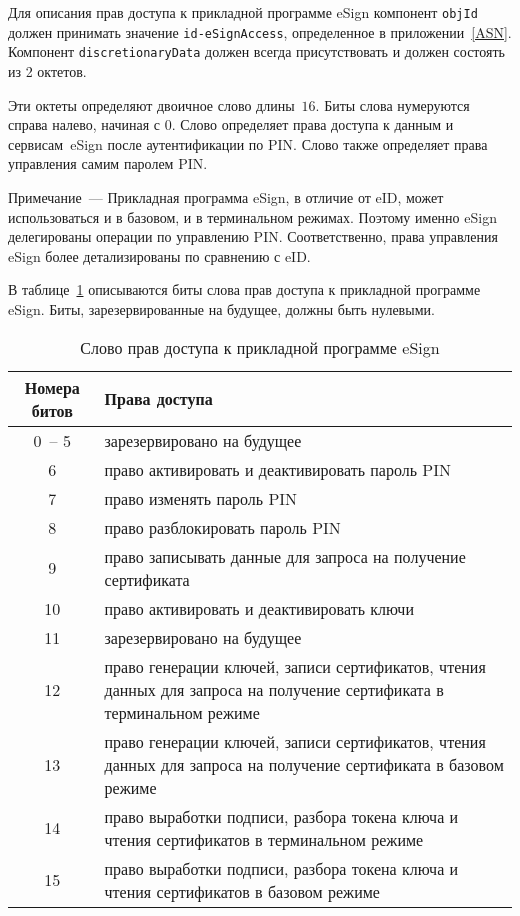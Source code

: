 Для описания прав доступа к прикладной программе eSign компонент \verb|objId| 
должен принимать значение \verb|id-eSignAccess|, определенное в 
приложении~\ref{ASN}. Компонент \verb|discretionaryData| должен всегда 
присутствовать и должен состоять из 2 октетов.


Эти октеты определяют двоичное слово длины~$16$. 
Биты слова нумеруются справа налево, начиная с 0. 
Слово определяет права доступа к данным и сервисам~eSign
после аутентификации по PIN. Слово также определяет права управления самим 
паролем PIN. 

\begin{note}
Примечание~--- 
Прикладная программа eSign, в отличие от eID, может использоваться и в базовом, 
и в терминальном режимах. Поэтому именно eSign делегированы операции по 
управлению PIN. Соответственно, права управления eSign более детализированы по 
сравнению с eID.
\end{note}

В таблице~\ref{Table.DATA.SMTAccess} описываются биты слова прав доступа
к прикладной программе eSign. Биты, зарезервированные на будущее, 
должны быть нулевыми.

\begin{table}[h!]
\caption{Слово прав доступа к прикладной программе eSign}
\label{Table.DATA.SMTAccess}
\begin{tabular}{|c|p{13.5cm}|}
\hline
Номера битов & Права доступа\\
\hline
\hline
0~-- 5 &  
зарезервировано на будущее\\ 
%
\hline 
6 &
право активировать и деактивировать пароль PIN\\ 
%
\hline 
7 &
право изменять пароль PIN\\ 
%
\hline 
8 &
право разблокировать пароль PIN\\ 
%
\hline 
9 &
право записывать данные для запроса на получение сертификата\\ 
%
\hline 
10 &
право активировать и деактивировать ключи\\ 
%
\hline 
11 &
зарезервировано на будущее\\ 
%
\hline 
12 &
право генерации ключей, записи сертификатов, 
чтения данных для запроса на получение сертификата
в терминальном режиме\\ 
%
\hline 
13 &
право генерации ключей, записи сертификатов, 
чтения данных для запроса на получение сертификата
в базовом режиме\\ 
%
\hline 
14 &
право выработки подписи, разбора токена ключа и чтения сертификатов 
в терминальном режиме\\ 
%
\hline 
15 &
право выработки подписи, разбора токена ключа и чтения сертификатов 
в базовом режиме\\ 
\hline 
\end{tabular}
\end{table}

